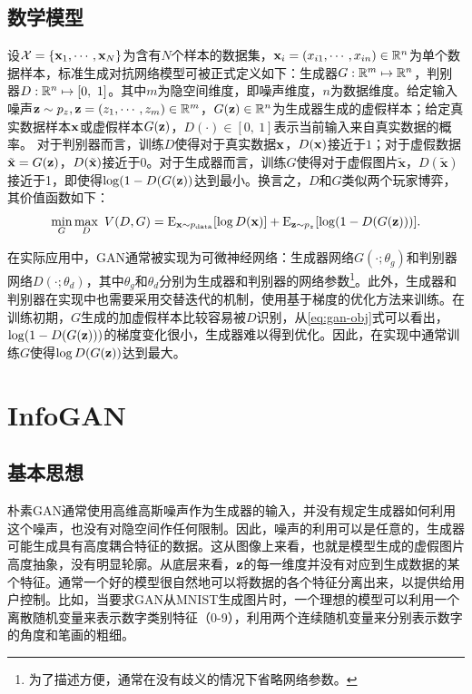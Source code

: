 \subsection{数学模型}
设$\mathcal{X} = \{\mathbf{x}_1, \cdots, \mathbf{x}_N\}$为含有$N$个样本的数据集，$\mathbf{x}_i = (x_{i1}, \cdots, x_{in}) \in \mathbb{R}^n$为单个数据样本，标准生成对抗网络模型可被正式定义如下：生成器$G: \mathbb{R}^m \mapsto \mathbb{R}^n$，判别器$D: \mathbb{R}^n \mapsto [0, ~1]$。其中$m$为隐空间维度，即噪声维度，$n$为数据维度。给定输入噪声$\mathbf{z} \sim p_z, \mathbf{z} = (z_1, \cdots, z_m) \in \mathbb{R}^m$，$G(\mathbf{z}) \in \mathbb{R}^n$为生成器生成的虚假样本；给定真实数据样本$\mathbf{x}$或虚假样本$G(\mathbf{z})$，$D(\cdot) \in [0,~1]$表示当前输入来自真实数据的概率。
对于判别器而言，训练$D$使得对于真实数据$\mathbf{x}$，$D(\mathbf{x})$接近于$1$；对于虚假数据$\tilde{\mathbf{x}} = G(\mathbf{z})$，$D(\tilde{\mathbf{x}})$接近于$0$。对于生成器而言，训练$G$使得对于虚假图片$\tilde{\mathbf{x}}$，$D(\tilde{\mathbf{x}})$接近于1，即使得$\log(1 - D(G(\mathbf{z}))$达到最小。换言之，$D$和$G$类似两个玩家博弈，其价值函数如下：
\begin{equation}
  \min_G\max_D ~V(D,G) =
    \text{E}_{\mathbf{x} \sim p_{\text{data}}}[\log D(\mathbf{x})] + 
    \text{E}_{\mathbf{z} \sim p_z}[\log(1-D(G(\mathbf{z})))].
  \label{eq:gan-obj}
\end{equation}

在实际应用中，GAN通常被实现为可微神经网络：生成器网络$G(\cdot; {\theta}_g)$和判别器网络$D(\cdot; {\theta}_d)$，其中${\theta}_g$和${\theta}_d$分别为生成器和判别器的网络参数\footnote{为了描述方便，通常在没有歧义的情况下省略网络参数。}。此外，生成器和判别器在实现中也需要采用交替迭代的机制，使用基于梯度的优化方法来训练。在训练初期，$G$生成的加虚假样本比较容易被$D$识别，从\eqref{eq:gan-obj}式可以看出，$\log(1 - D(G(\mathbf{z})))$的梯度变化很小，生成器难以得到优化。因此，在实现中通常训练$G$使得$\log D(G(\mathbf{z}))$达到最大。

\section{InfoGAN}\label{sec:infogan}
\subsection{基本思想}
朴素GAN通常使用高维高斯噪声作为生成器的输入，并没有规定生成器如何利用这个噪声，也没有对隐空间作任何限制。因此，噪声的利用可以是任意的，生成器可能生成具有高度耦合特征的数据。这从图像上来看，也就是模型生成的虚假图片高度抽象，没有明显轮廓。从底层来看，$\mathbf{z}$的每一维度并没有对应到生成数据的某个特征。通常一个好的模型很自然地可以将数据的各个特征分离出来，以提供给用户控制。比如，当要求GAN从MNIST\citep{lecun1989backpropagation}生成图片时，一个理想的模型可以利用一个离散随机变量来表示数字类别特征（0-9），利用两个连续随机变量来分别表示数字的角度和笔画的粗细。

